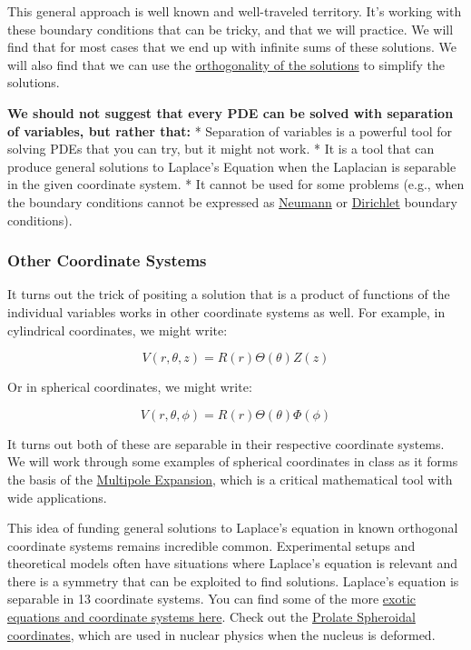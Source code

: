 This general approach is well known and well-traveled territory. It's
working with these boundary conditions that can be tricky, and that we
will practice. We will find that for most cases that we end up with
infinite sums of these solutions. We will also find that we can use the
\href{https://en.wikipedia.org/wiki/Orthogonal_functions}{orthogonality
of the solutions} to simplify the solutions.

\textbf{We should not suggest that every PDE can be solved with
separation of variables, but rather that:} * Separation of variables is
a powerful tool for solving PDEs that you can try, but it might not
work. * It is a tool that can produce general solutions to Laplace's
Equation when the Laplacian is separable in the given coordinate system.
* It cannot be used for some problems (e.g., when the boundary
conditions cannot be expressed as
\href{https://en.wikipedia.org/wiki/Neumann_boundary_condition}{Neumann}
or
\href{https://en.wikipedia.org/wiki/Dirichlet_boundary_condition}{Dirichlet}
boundary conditions).

\subsubsection{Other Coordinate Systems}\label{other-coordinate-systems}

It turns out the trick of positing a solution that is a product of
functions of the individual variables works in other coordinate systems
as well. For example, in cylindrical coordinates, we might write:

\[V(r,\theta,z) = R(r)\Theta(\theta)Z(z)\]

Or in spherical coordinates, we might write:

\[V(r,\theta,\phi) = R(r)\Theta(\theta)\Phi(\phi)\]

It turns out both of these are separable in their respective coordinate
systems. We will work through some examples of spherical coordinates in
class as it forms the basis of the
\href{https://en.wikipedia.org/wiki/Multipole_expansion}{Multipole
Expansion}, which is a critical mathematical tool with wide
applications.

This idea of funding general solutions to Laplace's equation in known
orthogonal coordinate systems remains incredible common. Experimental
setups and theoretical models often have situations where Laplace's
equation is relevant and there is a symmetry that can be exploited to
find solutions. Laplace's equation is separable in 13 coordinate
systems. You can find some of the more
\href{https://en.wikipedia.org/wiki/Orthogonal_coordinates\#Table_of_three-dimensional_orthogonal_coordinates}{exotic
equations and coordinate systems here}. Check out the
\href{https://en.wikipedia.org/wiki/Prolate_spheroidal_coordinates}{Prolate
Spheroidal coordinates}, which are used in nuclear physics when the
nucleus is deformed.

